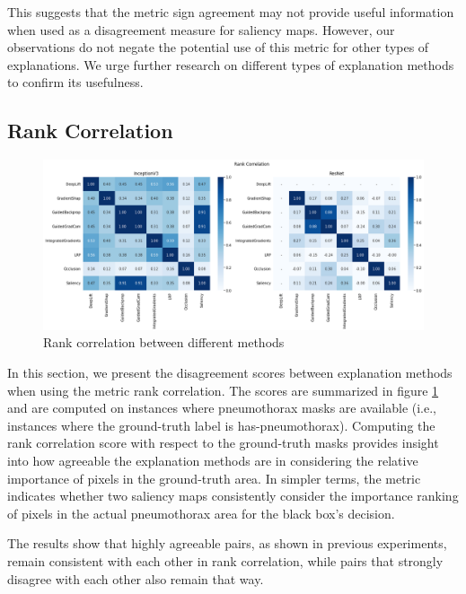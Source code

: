 This suggests that the metric sign agreement may not provide useful information when used as a disagreement measure for saliency maps. However, our observations do not negate the potential use of this metric for other types of explanations. We urge further research on different types of explanation methods to confirm its usefulness.

\subsection{Rank Correlation}
\label{subsec:rankCorrelation}

\begin{figure}
    \centering
    \includegraphics[width=\textwidth]{images/results/rank-correlation.png}
    \caption{Rank correlation between different methods}
    \label{fig:rankCorrelation}
\end{figure}
In this section, we present the disagreement scores between explanation methods when using the metric rank correlation. The scores are summarized in figure \ref{fig:rankCorrelation} and are computed on instances where pneumothorax masks are available (i.e., instances where the ground-truth label is has-pneumothorax). Computing the rank correlation score with respect to the ground-truth masks provides insight into how agreeable the explanation methods are in considering the relative importance of pixels in the ground-truth area. In simpler terms, the metric indicates whether two saliency maps consistently consider the importance ranking of pixels in the actual pneumothorax area for the black box's decision.

The results show that highly agreeable pairs, as shown in previous experiments, remain consistent with each other in rank correlation, while pairs that strongly disagree with each other also remain that way.

